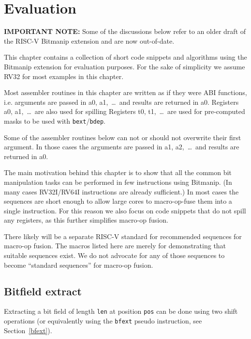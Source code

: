 \chapter{Evaluation}

\hrulefill

\textbf{IMPORTANT NOTE:} Some of the discussions below refer to an older draft of the
RISC-V Bitmanip extension and are now out-of-date.

\hrulefill

This chapter contains a collection of short code snippets and algorithms using
the Bitmanip extension for evaluation purposes. For the sake of simplicity we
assume RV32 for most examples in this chapter.

Most assembler routines in this chapter are written as if they were ABI functions,
i.e. arguments are passed in a0, a1,~\dots~and results are returned in a0. Registers
a0, a1,~\dots~are also used for spilling Registers t0, t1,~\dots~are used for
pre-computed masks to be used with {\tt bext}/{\tt bdep}.

Some of the assembler routines below can not or should not overwrite their
first argument. In those cases the arguments are passed in a1, a2,~\dots~and
results are returned in a0.

The main motivation behind this chapter is to show that all the common bit
manipulation tasks can be performed in few instructions using Bitmanip. (In
many cases RV32I/RV64I instructions are already sufficient.) In most cases the
sequences are short enough to allow large cores to macro-op-fuse them into a
single instruction. For this reason we also focus on code snippets that do
not spill any registers, as this further simplifies macro-op fusion.

There likely will be a separate RISC-V standard for recommended sequences for
macro-op fusion. The macros listed here are merely for demonstrating that
suitable sequences exist. We do not advocate for any of those sequences to
become ``standard sequences'' for macro-op fusion.


\section{Bitfield extract}

Extracting a bit field of length {\tt len} at position {\tt pos} can be done using
two shift operations (or equivalently using the {\tt bfext} pseudo instruction, see
Section~\ref{bfext}).

